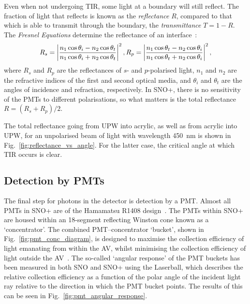 Even when not undergoing TIR, some light at a boundary will still reflect. The fraction of light that reflects is known as the \textit{reflectance} $R$, compared to that which is able to transmit through the boundary, the \textit{transmittance} $T=1-R$. The \textit{Fresnel Equations} determine the reflectance of an interface~\cite{hechtSectionFresnelEquations2014}:%
\begin{equation}
    R_{s} = \left|\frac{n_{1}\cos{\theta_{i}}-n_{2}\cos{\theta_{t}}}{n_{1}\cos{\theta_{i}}+n_{2}\cos{\theta_{t}}}\right|^{2},\\
    R_{p} = \left|\frac{n_{1}\cos{\theta_{t}}-n_{2}\cos{\theta_{i}}}{n_{1}\cos{\theta_{t}}+n_{2}\cos{\theta_{i}}}\right|^{2},
\end{equation}
where $R_{s}$ and $R_{p}$ are the reflectances of $s$- and $p$-polarised light, $n_{1}$ and $n_{2}$ are the refractive indices of the first and second optical media, and $\theta_{i}$ and $\theta_{t}$ are the angles of incidence and refraction, respectively. In SNO+, there is no sensitivity of the PMTs to different polarisations, so what matters is the total reflectance $R = \left(R_{s}+R_{p}\right)/2$.

The total reflectance going from UPW into acrylic, as well as from acrylic into UPW, for an unpolarised beam of light with wavelength \SI{450}{\nm} is shown in Fig.~\ref{fig:reflectance_vs_angle}. For the latter case, the critical angle at which TIR occurs is clear.

\subsection{Detection by PMTs}\label{sec:pmts}
The final step for photons in the detector is detection by a PMT. Almost all PMTs in SNO+ are of the Hamamatsu R1408 design~\cite{BOGER2000172}. %
The PMTs within SNO+ are housed within an 18-segment reflecting Winston cone known as a `concentrator'. The combined PMT--concentrator `bucket', shown in Fig.~\ref{fig:pmt_conc_diagram}, is designed to maximise the collection efficiency of light emanating from within the AV, whilst minimising the collection efficiency of light outside the AV~\cite{moorheadReflectorsCherenkovDetectors1992}. %
The so-called `angular response' of the PMT buckets has been measured in both SNO and SNO+ using the Laserball, which describes the relative collection efficiency as a function of the polar angle of the incident light ray relative to the direction in which the PMT bucket points. The results of this can be seen in Fig.~\ref{fig:pmt_angular_response}.

